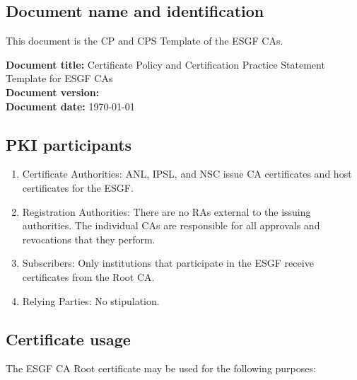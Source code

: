 \subsection{Document name and identification}\label{document-name-and-identification}

This document is the CP and CPS Template of the ESGF CAs.

\textbf{Document title:} Certificate Policy and Certification Practice Statement Template for ESGF CAs\\
\textbf{Document version:} \versionnum\\

\textbf{Document date:} \today

\subsection{PKI participants}\label{pki-participants}

\begin{enumerate}
\item
  
  Certificate Authorities: ANL, IPSL, and NSC issue CA certificates and host certificates for the ESGF.
  
\item
  
  Registration Authorities: There are no RAs external to the issuing
  authorities. The individual CAs are responsible for all approvals and revocations that they perform.
  
\item
  
  Subscribers: Only institutions that participate in the ESGF receive
  certificates from the Root CA.
  
\item
  
  Relying Parties: No stipulation.
  
\end{enumerate}

\subsection{Certificate usage}\label{certificate-usage}

The ESGF CA Root certificate may be used for the following purposes:

